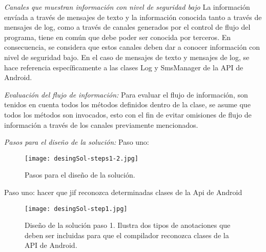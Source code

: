 \textit{Canales que muestran información con nivel de seguridad bajo}\newline
La información envíada a través de mensajes de texto y la información conocida
tanto a través de mensajes de log, como a través de canales generados por el
control de flujo del programa, tiene en común que debe poder ser conocida por
terceros. En consecuencia, se considera que estos canales deben dar a conocer
información con nivel de seguridad bajo.\newline
En el caso de mensajes de texto y mensajes de log, se hace referencia
específicamente a las clases Log y SmsManager de la API de Android.\newline

\textit{Evaluación del flujo de información:}\newline
Para evaluar el flujo de información, son tenidos en cuenta todos los métodos
definidos dentro de la clase, se asume que todos los métodos son invocados, esto
con el fin de evitar omisiones de flujo de información a través de los canales
previamente mencionados.

\textit{Pasos para el diseño de la solución:}\newline
Paso uno:\newline

\begin{figure}[h!]
	\begin{center}
	\texttt{[image: desingSol-steps1-2.jpg]}
	\end{center}
	\caption{Pasos para el diseño de la solución.}
	\label{fig:desingSol-steps1-2}
\end{figure}

Paso uno: hacer que jif reconozca determinadas clases de la Api de
Android\newline 

\begin{figure}[h!]
	\begin{center}
	\texttt{[image: desingSol-step1.jpg]}
	\end{center}
	\caption{Diseño de la solución paso 1. Ilustra dos tipos de anotaciones que
	deben ser incluidas para que el compilador reconozca clases de la API de
	Android.}
	\label{fig:desingSol-step1}
\end{figure}

